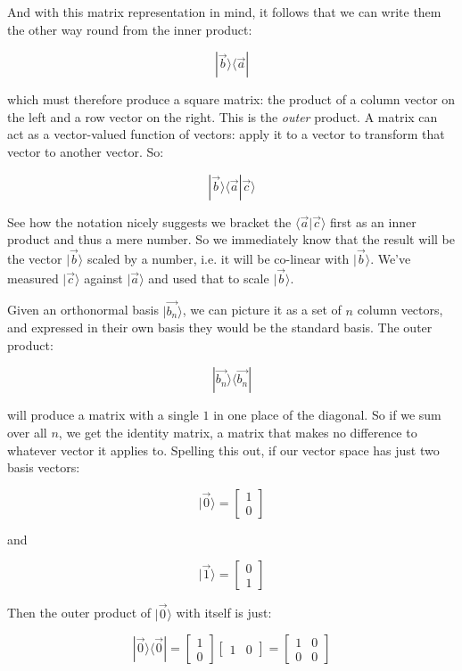 And with this matrix representation in mind, it follows that we can write them the other way round from the inner product:

$$|\vec{b} \rangle \langle \vec{a} |$$

which must therefore produce a square matrix: the product of a column vector on the left and a row vector on the right. This is the \textit{outer} product. A matrix can act as a vector-valued function of vectors: apply it to a vector to transform that vector to another vector. So:

$$|\vec{b} \rangle \langle \vec{a} | \vec{c} \rangle$$

See how the notation nicely suggests we bracket the $\langle \vec{a} | \vec{c} \rangle$ first as an inner product and thus a mere number. So we immediately know that the result will be the vector $|\vec{b} \rangle$ scaled by a number, i.e. it will be co-linear with $|\vec{b} \rangle$. We've measured $|\vec{c} \rangle$ against $|\vec{a} \rangle$ and used that to scale $|\vec{b} \rangle$.

Given an orthonormal basis $|\vec{b_n} \rangle$, we can picture it as a set of $n$ column vectors, and expressed in their own basis they would be the standard basis. The outer product:

$$|\vec{b_n} \rangle \langle \vec{b_n} |$$

will produce a matrix with a single $1$ in one place of the diagonal. So if we sum over all $n$, we get the identity matrix, a matrix that makes no difference to whatever vector it applies to. Spelling this out, if our vector space has just two basis vectors:

$$|\vec{0} \rangle = \begin{bmatrix} 1 \\ 0 \end{bmatrix}$$

and

$$|\vec{1} \rangle = \begin{bmatrix} 0 \\ 1 \end{bmatrix}$$

Then the outer product of $|\vec{0} \rangle$ with itself is just:

$$
|\vec{0} \rangle \langle \vec{0}| = 
\begin{bmatrix} 1 \\ 0 \end{bmatrix}
\begin{bmatrix} 1 & 0 \end{bmatrix} =
\begin{bmatrix} 1 & 0 \\ 0 & 0 \end{bmatrix}
$$

